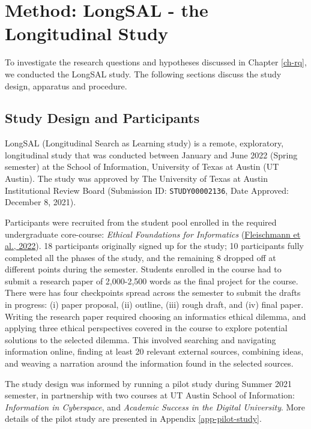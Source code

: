 \documentclass[letterpaper, nobind]{templates/ociamthesis}
\begin{document}
\hypertarget{method-longsal---the-longitudinal-study}{%
\chapter{Method: LongSAL - the Longitudinal Study}\label{method-longsal---the-longitudinal-study}}

To investigate the research questions and hypotheses discussed in Chapter \ref{ch-rq}, we conducted the LongSAL study.
The following sections discuss the study design, apparatus and procedure.

\hypertarget{sec-method-exp-design}{%
\section{Study Design and Participants}\label{sec-method-exp-design}}

LongSAL (Longitudinal Search as Learning study) is a remote, exploratory, longitudinal study that was conducted between January and June 2022 (Spring semester) at the School of Information, University of Texas at Austin (UT Austin).
The study was approved by The University of Texas at Austin Institutional Review Board (Submission ID: \texttt{STUDY00002136}, Date Approved: December 8, 2021).

Participants were recruited from the student pool enrolled in the required undergraduate core-course: \emph{Ethical Foundations for Informatics} (\protect\hyperlink{ref-fleischmann2022i303}{Fleischmann et al., 2022}).
18 participants originally signed up for the study; 10 participants fully completed all the phases of the study, and the remaining 8 dropped off at different points during the semester.
Students enrolled in the course had to submit a research paper of 2,000-2,500 words as the final project for the course.
There were has four checkpoints spread across the semester to submit the drafts in progress: (i) paper proposal, (ii) outline, (iii) rough draft, and (iv) final paper.
Writing the research paper required choosing an informatics ethical dilemma, and applying three ethical perspectives covered in the course to explore potential solutions to the selected dilemma.
This involved searching and navigating information online, finding at least 20 relevant external sources, combining ideas, and weaving a narration around the information found in the selected sources.

The study design was informed by running a pilot study during Summer
2021 semester, in partnership with two courses at UT Austin School of
Information: \emph{Information in Cyberspace}, and \emph{Academic Success in the
Digital University}.
More details of the pilot study are presented in
Appendix \ref{app-pilot-study}.
\end{document}
